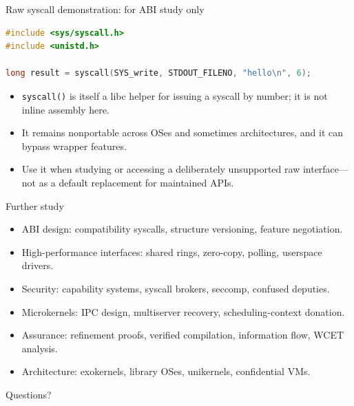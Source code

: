 \documentclass[aspectratio=169,11pt]{beamer}
\newcommand{\code}[1]{\texttt{#1}}
\begin{document}
\begin{frame}[fragile]{Raw syscall demonstration: for ABI study only}
\begin{lstlisting}[language=C]
#include <sys/syscall.h>
#include <unistd.h>

long result = syscall(SYS_write, STDOUT_FILENO, "hello\n", 6);
\end{lstlisting}
  \begin{itemize}
    \item \code{syscall()} is itself a libc helper for issuing a syscall by number; it is not inline assembly here.
    \item It remains nonportable across OSes and sometimes architectures, and it can bypass wrapper features.
    \item Use it when studying or accessing a deliberately unsupported raw interface---not as a default replacement for maintained APIs.
  \end{itemize}
\end{frame}

\begin{frame}{Further study}
  \begin{itemize}
    \item ABI design: compatibility syscalls, structure versioning, feature negotiation.
    \item High-performance interfaces: shared rings, zero-copy, polling, userspace drivers.
    \item Security: capability systems, syscall brokers, seccomp, confused deputies.
    \item Microkernels: IPC design, multiserver recovery, scheduling-context donation.
    \item Assurance: refinement proofs, verified compilation, information flow, WCET analysis.
    \item Architecture: exokernels, library OSes, unikernels, confidential VMs.
  \end{itemize}
  \begin{center}
    \Large Questions?
  \end{center}
\end{frame}
\end{document}
